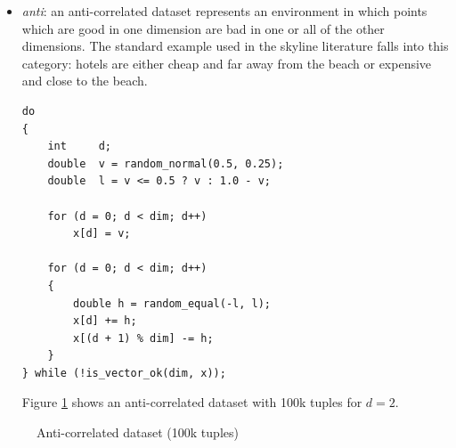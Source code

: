 \begin{itemize}
\item \emph{anti}:
an anti-correlated dataset represents an environment in which points
which are good in one dimension are bad in one or all of the other
dimensions. The standard example used in the skyline literature falls
into this category: hotels are either cheap and far away from the
beach or expensive and close to the beach.

\begin{lstlisting}
do
{
	int		d;
	double	v = random_normal(0.5, 0.25);
	double	l = v <= 0.5 ? v : 1.0 - v;
			
	for (d = 0; d < dim; d++)
		x[d] = v;
		
	for (d = 0; d < dim; d++)
	{
		double h = random_equal(-l, l);
		x[d] += h;
		x[(d + 1) % dim] -= h;
	}
} while (!is_vector_ok(dim, x));
\end{lstlisting}

Figure \ref{fig:density-2d-a2d1e5} shows an anti-correlated dataset
with 100k tuples for $d = 2$.
\end{itemize}

\begin{figure}[htbp]
\centering
{}
\caption{Anti-correlated dataset (100k tuples)}
\label{fig:density-2d-a2d1e5}
\end{figure}

